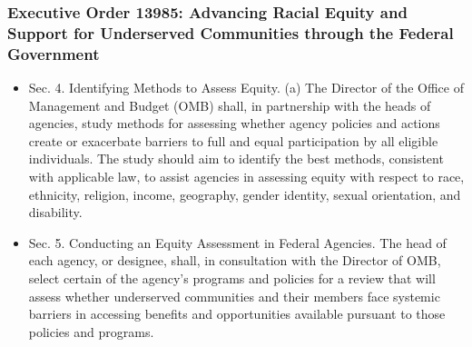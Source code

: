 \documentclass{beamer}
\begin{document}
\begin{frame}

  \frametitle{Executive Order 13985: {\small Advancing Racial Equity and Support for Underserved Communities through the Federal Government}}

  \begin{itemize}
  \item \alert{Sec. 4.  Identifying Methods to Assess Equity}.  (a)
    The Director of the Office of Management and Budget (OMB) shall,
    in partnership with the heads of agencies, study methods for
    assessing whether agency policies and actions create or exacerbate
    barriers to full and equal participation by all eligible
    individuals.  The study should aim to identify the best methods,
    consistent with applicable law, to assist agencies in assessing
    equity with respect to race, ethnicity, religion, income,
    geography, gender identity, sexual orientation, and disability.

    \vfill
  \item \alert{Sec. 5.  Conducting an Equity Assessment in Federal
      Agencies.}  The head of each agency, or designee, shall, in
    consultation with the Director of OMB, select certain of the
    agency's programs and policies for a review that will assess
    whether underserved communities and their members face systemic
    barriers in accessing benefits and opportunities available
    pursuant to those policies and programs.
  \end{itemize}

\end{frame}
\end{document}
